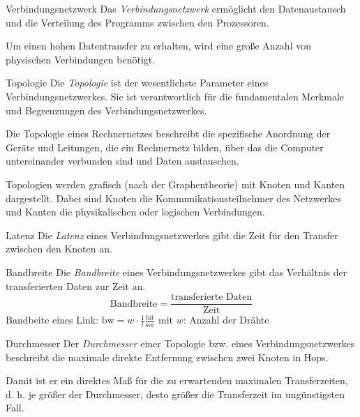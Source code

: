 \begin{defi}{Verbindungsnetzwerk}
    Das \emph{Verbindungsnetzwerk} ermöglicht den Datenaustausch und die Verteilung des Programms zwischen den Prozessoren.
    
    Um einen hohen Datentransfer zu erhalten, wird eine große Anzahl von physischen Verbindungen benötigt.
\end{defi}

\begin{defi}[Verbindungsnetzwerk]{Topologie}
    Die \emph{Topologie} ist der wesentlichste Parameter eines Verbindungsnetzwerkes.
    Sie ist verantwortlich für die fundamentalen Merkmale und Begrenzungen des Verbindungsnetzwerkes.
    
    Die Topologie eines Rechnernetzes beschreibt die spezifische Anordnung der Geräte und Leitungen, die ein Rechnernetz bilden, über das die Computer untereinander verbunden sind und Daten austauschen.
    
    Topologien werden grafisch (nach der Graphentheorie) mit Knoten und Kanten dargestellt.
    Dabei sind Knoten die Kommunikationsteilnehmer des Netzwerkes und Kanten die physikalischen oder logischen Verbindungen.
\end{defi}

\begin{defi}[Verbindungsnetzwerk]{Latenz}
    Die \emph{Latenz} eines Verbindungsnetzwerkes gibt die Zeit für den Transfer zwischen den Knoten an.
\end{defi}

\begin{defi}[Verbindungsnetzwerk]{Bandbreite}
    Die \emph{Bandbreite} eines Verbindungsnetzwerkes gibt das Verhältnis der transferierten Daten zur Zeit an.
    \[\text{Bandbreite} = \frac{\text{transferierte Daten}}{\text{Zeit}}\]
    Bandbeite eines Link: $\text{bw} = w \cdot \frac{1}{t}\frac{\text{bit}}{\text{sec}}$
    mit $w$: Anzahl der Drähte
\end{defi}

\begin{defi}[Verbindungsnetzwerk]{Durchmesser}
    Der \emph{Durchmesser} einer Topologie bzw. eines Verbindungsnetzwerkes beschreibt die maximale direkte Entfernung zwischen zwei Knoten in Hops.
    
    Damit ist er ein direktes Maß für die zu erwartenden maximalen Transferzeiten, d. h. je größer der Durchmesser, desto größer die Transferzeit im ungünstigsten Fall.
\end{defi}

